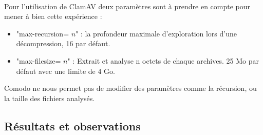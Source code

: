 \documentclass[smallextended]{svjour3}       %
\begin{document}
\\Pour l'utilisation de ClamAV deux paramètres sont à prendre en compte pour mener à bien cette expérience :
\begin{itemize}
\item "max-recursion= $n$" : la profondeur maximale d'exploration lors d'une décompression, 16 par défaut.
\item "max-filesize= $n$" : Extrait et analyse  n octets de chaque archives. 25 Mo par défaut avec une limite de 4 Go.
\end{itemize}
Comodo ne nous permet pas de modifier des paramètres comme la récursion, ou la taille des fichiers analysés.

\subsection{Résultats et observations}
\label{3.2résultats}
\end{document}

